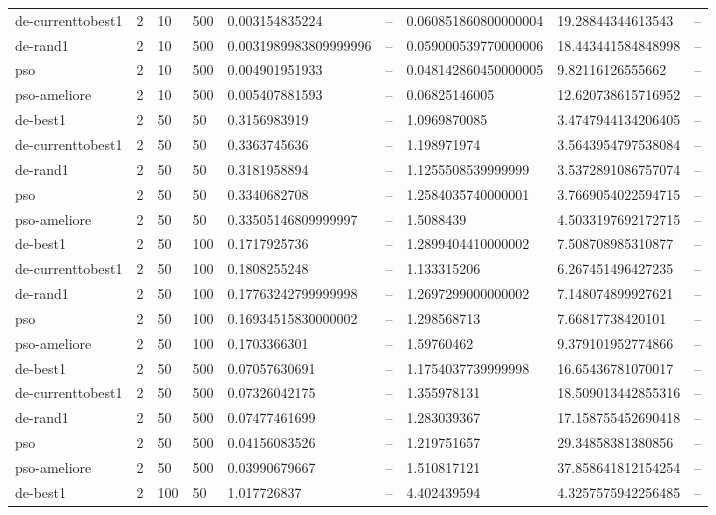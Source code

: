 \begin{table}[t]
\begin{tabular}{lllllllll}
de-currenttobest1 & 2 & 10 & 500 & 0.003154835224 & -- & 0.060851860800000004 & 19.28844344613543 & -- \\
de-rand1 & 2 & 10 & 500 & 0.0031989983809999996 & -- & 0.059000539770000006 & 18.443441584848998 & -- \\
pso & 2 & 10 & 500 & 0.004901951933 & -- & 0.048142860450000005 & 9.82116126555662 & -- \\
pso-ameliore & 2 & 10 & 500 & 0.005407881593 & -- & 0.06825146005 & 12.620738615716952 & -- \\
de-best1 & 2 & 50 & 50 & 0.3156983919 & -- & 1.0969870085 & 3.4747944134206405 & -- \\
de-currenttobest1 & 2 & 50 & 50 & 0.3363745636 & -- & 1.198971974 & 3.5643954797538084 & -- \\
de-rand1 & 2 & 50 & 50 & 0.3181958894 & -- & 1.1255508539999999 & 3.5372891086757074 & -- \\
pso & 2 & 50 & 50 & 0.3340682708 & -- & 1.2584035740000001 & 3.7669054022594715 & -- \\
pso-ameliore & 2 & 50 & 50 & 0.33505146809999997 & -- & 1.5088439 & 4.5033197692172715 & -- \\
de-best1 & 2 & 50 & 100 & 0.1717925736 & -- & 1.2899404410000002 & 7.508708985310877 & -- \\
de-currenttobest1 & 2 & 50 & 100 & 0.1808255248 & -- & 1.133315206 & 6.267451496427235 & -- \\
de-rand1 & 2 & 50 & 100 & 0.17763242799999998 & -- & 1.2697299000000002 & 7.148074899927621 & -- \\
pso & 2 & 50 & 100 & 0.16934515830000002 & -- & 1.298568713 & 7.66817738420101 & -- \\
pso-ameliore & 2 & 50 & 100 & 0.1703366301 & -- & 1.59760462 & 9.379101952774866 & -- \\
de-best1 & 2 & 50 & 500 & 0.07057630691 & -- & 1.1754037739999998 & 16.65436781070017 & -- \\
de-currenttobest1 & 2 & 50 & 500 & 0.07326042175 & -- & 1.355978131 & 18.509013442855316 & -- \\
de-rand1 & 2 & 50 & 500 & 0.07477461699 & -- & 1.283039367 & 17.158755452690418 & -- \\
pso & 2 & 50 & 500 & 0.04156083526 & -- & 1.219751657 & 29.34858381380856 & -- \\
pso-ameliore & 2 & 50 & 500 & 0.03990679667 & -- & 1.510817121 & 37.858641812154254 & -- \\
de-best1 & 2 & 100 & 50 & 1.017726837 & -- & 4.402439594 & 4.3257575942256485 & -- \\

\end{tabular}
\end{table}
